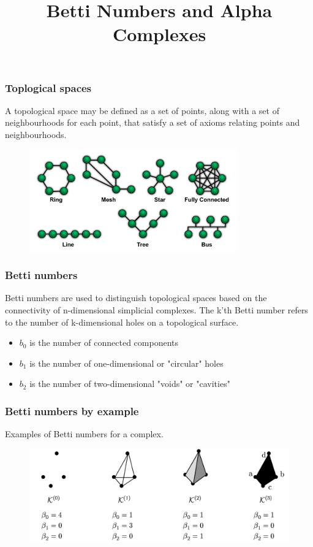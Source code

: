 \documentclass[10pt, compress]{beamer}
\title{Betti Numbers and Alpha Complexes}
\begin{document}
\maketitle

\begin{frame}[fragile]
    \frametitle{Toplogical spaces}
    A topological space may be defined as a set of points, along with a set of
    neighbourhoods for each point, that satisfy a set of axioms relating points
    and neighbourhoods.
    \begin{figure}
        \centering
        \includegraphics[width=0.8\textwidth]{fig/topologies.pdf}
    \end{figure}
\end{frame}
\begin{frame}[fragile]
    \frametitle{Betti numbers}
    Betti numbers are used to distinguish topological spaces based on the
    connectivity of n-dimensional simplicial complexes.
    The k'th Betti number refers to the number of k-dimensional holes on a
    topological surface.
    \begin{itemize}
        \item $b_0$ is the number of connected components
        \item $b_1$ is the number of one-dimensional or "circular" holes
        \item $b_2$ is the number of two-dimensional "voids" or "cavities"
    \end{itemize}
\end{frame}
\begin{frame}[fragile]
    \frametitle{Betti numbers by example}
    Examples of Betti numbers for a complex.
    \begin{figure}
        \centering
        \includegraphics[width=1.0\textwidth]{fig/betti_example.png}
    \end{figure}
\end{frame}
\end{document}
